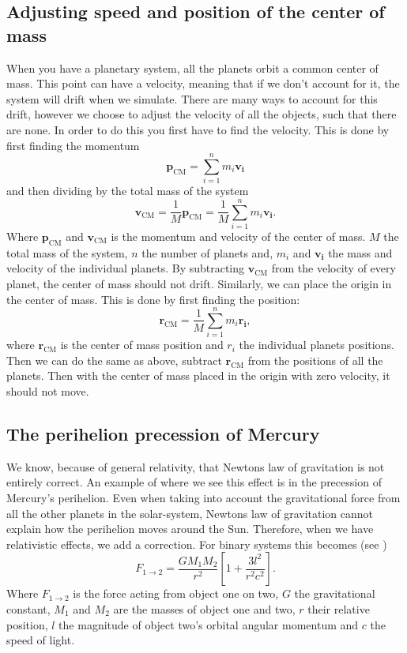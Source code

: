 \documentclass[reprint, english,notitlepage,nofootinbib]{revtex4-1}  %
\begin{document}
\subsection{Adjusting speed and position of the center of mass}
When you have a planetary system, all the planets orbit a common center of mass. This point can have a velocity, meaning that if we don't account for it, the system will drift when we simulate. There are many ways to account for this drift, however we choose to adjust the velocity of all the objects, such that there are none. In order to do this you first have to find the velocity. This is done by first finding the momentum
\begin{equation*}
	\mathbf{p}_{\text{CM}} = \sum_{i=1}^{n}m_i\mathbf{v_i}
\end{equation*} 
and then dividing by the total mass of the system
\begin{equation}
	\label{eq:v_cm}
	\mathbf{v}_{\text{CM}} = \frac{1}{M}\mathbf{p}_{\text{CM}} =  \frac{1}{M}\sum_{i=1}^{n}m_i\mathbf{v_i}.
\end{equation} 
Where $\mathbf{p}_{\text{CM}}$ and $\mathbf{v}_{\text{CM}}$ is the momentum and velocity of the center of mass. $M$ the total mass of the system, $n$ the number of planets and, $m_i$ and $\mathbf{v_i}$ the mass and velocity of the individual planets. By subtracting $\mathbf{v}_{\text{CM}}$ from the velocity of every planet, the center of mass should not drift. Similarly, we can place the origin in the center of mass. This is done by first finding the position:
\begin{equation}
	\label{eq:r_cm}
	\mathbf{r}_{\text{CM}} =  \frac{1}{M}\sum_{i=1}^{n}m_i\mathbf{r_i},
\end{equation}
where $\mathbf{r}_{\text{CM}}$ is the center of mass position and $r_i$ the individual planets positions. Then we can do the same as above, subtract $\mathbf{r}_{\text{CM}}$ from the positions of all the planets. Then with the center of mass placed in the origin with zero velocity, it should not move.

\subsection{The perihelion precession of Mercury}
We know, because of general relativity, that Newtons law of gravitation is not entirely correct. An example of where we see this effect is in the precession of Mercury's perihelion. Even when taking into account the gravitational force from all the other planets in the solar-system, Newtons law of gravitation cannot explain how the perihelion moves around the Sun. Therefore, when we have relativistic effects, we add a correction. For binary systems this becomes (see \citep{oppgavetekst})
\begin{equation}
	\label{eq:general_relativity}
	F_{1 \rightarrow 2} = \frac{GM_1M_2}{r^2}\left[ 1 + \frac{3l^2}{r^2c^2} \right].
\end{equation}
Where $F_{1 \rightarrow 2}$ is the force acting from object one on two, $G$ the gravitational constant, $M_1$ and $M_2$ are the masses of object one and two, $r$ their relative position, $l$ the magnitude of object two's orbital angular momentum and $c$ the speed of light.
\end{document}
